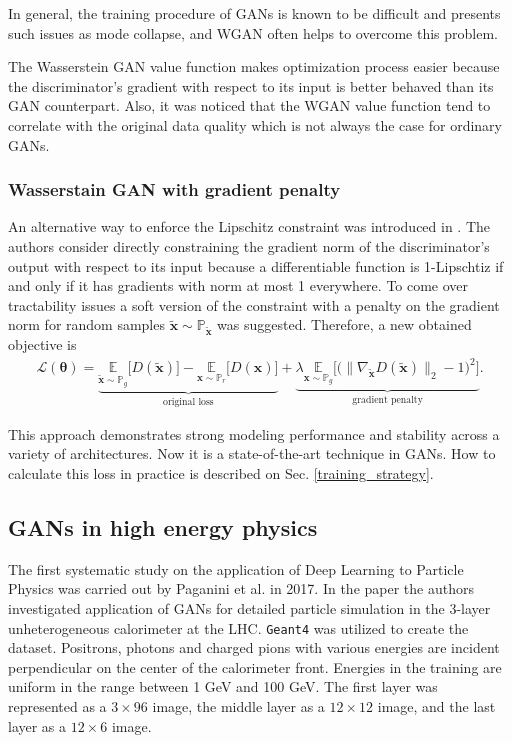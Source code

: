 \documentclass{webofc}
\newcommand{\vx}{\mathbf{x}}
\begin{document}
In general, the training procedure of GANs is known to be difficult and presents such issues as mode collapse, and WGAN often helps to overcome this problem.

The Wasserstein GAN value function makes optimization process easier because the discriminator's gradient with respect to its input is better behaved than its GAN counterpart. Also, it was noticed that the WGAN value function tend to correlate with the original data quality which is not always the case for ordinary GANs.


\subsubsection{Wasserstain GAN with gradient penalty}
An alternative way to enforce the Lipschitz constraint was introduced in \cite{gulrajani2017improved}. The authors consider directly constraining the gradient norm of the discriminator's output with respect to its input because a differentiable function is 1-Lipschtiz if and only if it has gradients with norm at most 1 everywhere. To come over tractability issues a soft version of the constraint with a penalty on the gradient norm for random samples $\tilde{\vx} \sim \mathbb{P}_{\tilde{\vx}}$ was suggested. Therefore, a new obtained objective is 
\begin{equation} \label{gpwgan-loss}
\begin{gathered}
\mathcal{L}(\bm{\theta}) =
\underbrace{ \underset{\tilde{\vx} \sim \mathbb{P}_g}{\mathbb{E}}  \Big[D(\tilde{\vx})\Big] - \underset{\vx \sim \mathbb{P}_r}{\mathbb{E}} \Big[D(\vx)\Big]}_{\text{original loss}} + 
\underbrace{ \lambda \underset{\vx \sim \mathbb{P}_g}{\mathbb{E}} \Big[\big(\|\nabla_{\tilde{\vx}} D(\tilde{\vx})\|_2 - 1\big)^2 \Big]}_{\text{gradient penalty}}.
\end{gathered}
\end{equation}

This approach demonstrates strong modeling performance and stability across a variety of architectures.  Now it is a state-of-the-art technique in GANs. 
How to calculate this loss in practice is described on Sec. \ref{training_strategy}.

\subsection{GANs in high energy physics}
The first systematic study on the application of Deep Learning to Particle Physics was carried out by Paganini et al. in 2017. In the paper \cite{paganini2017calogan} the authors investigated application of GANs for detailed particle simulation in the 3-layer unheterogeneous calorimeter at the LHC. \texttt{Geant4} was utilized to create the dataset. Positrons, photons and charged pions with various energies are incident perpendicular on the center of the calorimeter front. Energies in the training are uniform in the range between 1 GeV and 100 GeV.  The first layer was represented as a $3 \times 96$ image, the middle layer as a $12 \times 12$ image, and the last layer as a $12 \times 6$ image. 
\end{document}
